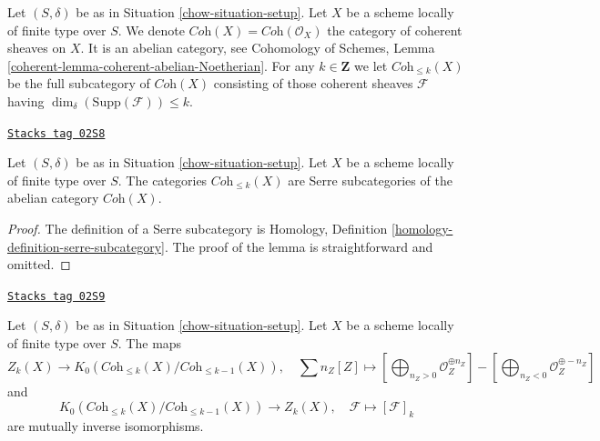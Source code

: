 \medskip\noindent
Let $(S, \delta)$ be as in Situation \ref{chow-situation-setup}.
Let $X$ be a scheme locally of finite type over $S$.
We denote $\textit{Coh}(X) = \textit{Coh}(\mathcal{O}_X)$
the category of coherent sheaves on $X$.
It is an abelian category, see
Cohomology of Schemes, Lemma \ref{coherent-lemma-coherent-abelian-Noetherian}.
For any $k \in \mathbf{Z}$ we let $\textit{Coh}_{\leq k}(X)$
be the full subcategory of $\textit{Coh}(X)$
consisting of those coherent sheaves $\mathcal{F}$
having $\dim_\delta(\text{Supp}(\mathcal{F})) \leq k$.

\begin{lemma}
\label{chow-lemma-Serre-subcategories}
\href{https://stacks.math.columbia.edu/tag/02S8}{\texttt{Stacks tag 02S8}}

Let $(S, \delta)$ be as in Situation \ref{chow-situation-setup}.
Let $X$ be a scheme locally of finite type over $S$.
The categories $\textit{Coh}_{\leq k}(X)$ are Serre subcategories
of the abelian category $\textit{Coh}(X)$.
\end{lemma}

\begin{proof}
The definition of a Serre subcategory is
Homology, Definition \ref{homology-definition-serre-subcategory}.
The proof of the lemma is straightforward and omitted.
\end{proof}

\begin{lemma}
\label{chow-lemma-cycles-k-group}
\href{https://stacks.math.columbia.edu/tag/02S9}{\texttt{Stacks tag 02S9}}

Let $(S, \delta)$ be as in Situation \ref{chow-situation-setup}.
Let $X$ be a scheme locally of finite type over $S$.
The maps
$$
Z_k(X)
\longrightarrow
K_0(\textit{Coh}_{\leq k}(X)/\textit{Coh}_{\leq k - 1}(X)),
\quad
\sum n_Z[Z] \mapsto
\left[\bigoplus\nolimits_{n_Z > 0} \mathcal{O}_Z^{\oplus n_Z}\right]
-
\left[\bigoplus\nolimits_{n_Z < 0} \mathcal{O}_Z^{\oplus -n_Z}\right]
$$
and
$$
K_0(\textit{Coh}_{\leq k}(X)/\textit{Coh}_{\leq k - 1}(X))
\longrightarrow
Z_k(X),\quad
\mathcal{F} \longmapsto [\mathcal{F}]_k
$$
are mutually inverse isomorphisms.
\end{lemma}

